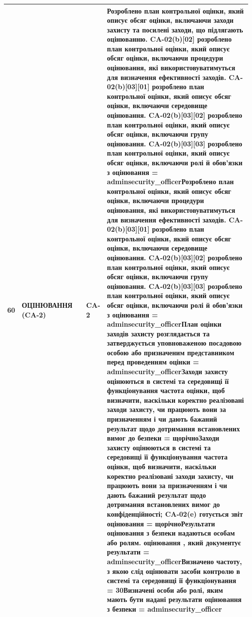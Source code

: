\documentclass[10pt]{article}
\begin{document}
\begin{longtable}{|c|>{\raggedright\arraybackslash}p{4cm}|>{\raggedright\arraybackslash}p{2.5cm}|>{\raggedright\arraybackslash}p{3.5cm}|>{\raggedright\arraybackslash}p{5.5cm}|}
60 & ОЦІНЮВАННЯ (CA-2) &  & CA-2 & Розроблено план контрольної оцінки, який описує обсяг оцінки, включаючи заходи захисту та посилені заходи, що підлягають оцінюванню. CA-02(b)[02] розроблено план контрольної оцінки, який описує обсяг оцінки, включаючи процедури оцінювання, які використовуватимуться для визначення ефективності заходів. CA-02(b)[03][01] розроблено план контрольної оцінки, який описує обсяг оцінки, включаючи середовище оцінювання. CA-02(b)[03][02] розроблено план контрольної оцінки, який описує обсяг оцінки, включаючи групу оцінювання. CA-02(b)[03][03] розроблено план контрольної оцінки, який описує обсяг оцінки, включаючи ролі й обов'язки з оцінювання = \textbf{adminsecurity\_\allowbreak{}officer}\newline Розроблено план контрольної оцінки, який описує обсяг оцінки, включаючи процедури оцінювання, які використовуватимуться для визначення ефективності заходів. CA-02(b)[03][01] розроблено план контрольної оцінки, який описує обсяг оцінки, включаючи середовище оцінювання. CA-02(b)[03][02] розроблено план контрольної оцінки, який описує обсяг оцінки, включаючи групу оцінювання. CA-02(b)[03][03] розроблено план контрольної оцінки, який описує обсяг оцінки, включаючи ролі й обов'язки з оцінювання = \textbf{adminsecurity\_\allowbreak{}officer}\newline План оцінки заходів захисту розглядається та затверджується уповноваженою посадовою особою або призначеним представником перед проведенням оцінки = \textbf{adminsecurity\_\allowbreak{}officer}\newline Заходи захисту оцінюються в системі та середовищі її функціонування частота оцінки, щоб визначити, наскільки коректно реалізовані заходи захисту, чи працюють вони за призначенням і чи дають бажаний результат щодо дотримання встановлених вимог до безпеки = \textbf{щорічно}\newline Заходи захисту оцінюються в системі та середовищі її функціонування частота оцінки, щоб визначити, наскільки коректно реалізовані заходи захисту, чи працюють вони за призначенням і чи дають бажаний результат щодо дотримання встановлених вимог до конфіденційності; CA-02(e) готується звіт оцінювання = \textbf{щорічно}\newline Результати оцінювання з безпеки надаються особам або ролям. оцінювання , який документує результати = \textbf{adminsecurity\_\allowbreak{}officer}\newline Визначено частоту, з якою слід оцінювати засоби контролю в системі та середовищі її функціонування = \textbf{30}\newline Визначені особи або ролі, яким мають бути надані результати оцінювання з безпеки = \textbf{adminsecurity\_\allowbreak{}officer} \\ \hline

\end{longtable}
\end{document}
